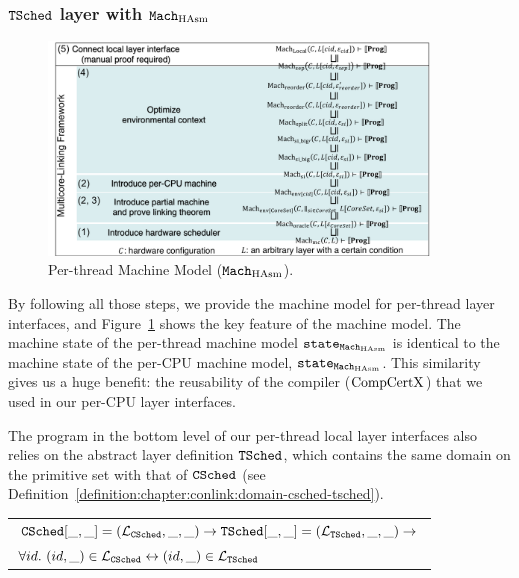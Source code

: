 \subsubsection{${{\mathrm{\texttt{TSched}}}}$ layer with ${\mathrm{\texttt{Mach}}}_{\mathrm{HAsm}}$} 



\begin{figure}
\begin{center}
\includegraphics[width=0.9\textwidth, page=9]{figs/conlink/concurrent_linking}
\end{center}
\caption{Per-thread Machine Model (${\mathrm{\texttt{Mach}}}_{\mathrm{HAsm}}$).}
\label{fig:chapter:conlink:per-thread-machine-model}
\end{figure}

By following all those steps, 
we provide the machine model for per-thread layer interfaces,
and  Figure~\ref{fig:chapter:conlink:per-thread-machine-model} shows 
the key feature of the machine model.
The machine state of the per-thread machine model ${\mathrm{\texttt{state}}}_{{\mathrm{\texttt{Mach}}}_{\mathrm{HAsm}}}$ is identical
 to the machine state of the per-CPU machine model, ${\mathrm{\texttt{state}}}_{{\mathrm{\texttt{Mach}}}_{\mathrm{HAsm}}}$.
This similarity gives us a huge benefit: the reusability of the compiler ($\mathrm{CompCertX}$) 
that we  used in our per-CPU layer interfaces. 

The program in the bottom level of our per-thread local layer interfaces also relies on 
the abstract layer definition ${{\mathrm{\texttt{TSched}}}}$,
which contains the same domain on the primitive set with that of ${{\mathrm{\texttt{CSched}}}}$ (see Definition~\ref{definition:chapter:conlink:domain-csched-tsched}).

\begin{definition}
\label{definition:chapter:conlink:domain-csched-tsched}
\begin{tabular}{P{0.95\textwidth}}
${{\mathrm{\texttt{CSched}}}}[\_, \_] = (\mathcal{L}_{{{\mathrm{\texttt{CSched}}}}}, \_ , \_) \rightarrow {{\mathrm{\texttt{TSched}}}}[\_, \_] = (\mathcal{L}_{{{\mathrm{\texttt{TSched}}}}}, \_ , \_) \rightarrow$\\
$\forall id.\ (id, \_) \in \Layer_{\CSched}  \leftrightarrow (id, \_) \in \Layer_{\TSched} $\\
\end{tabular}
\end{definition}

